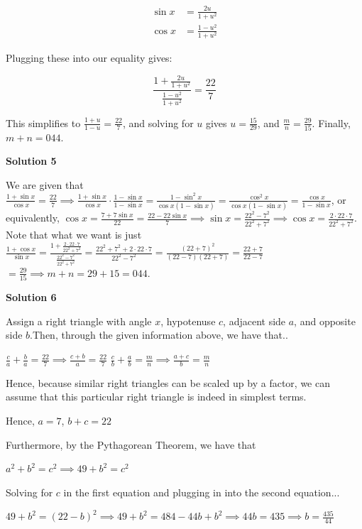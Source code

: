 \begin{enumerate}
 
 \begin{align*}\sin x &= \frac{2u}{1+u^2}\\ \cos x &= \frac{1-u^2}{1+u^2}\end{align*}


 Plugging these into our equality gives:

 
 \[\frac{1+\frac{2u}{1+u^2}}{\frac{1-u^2}{1+u^2}} = \frac{22}7\]

 This simplifies to $\frac{1+u}{1-u} = \frac{22}7$, and solving for $u$ gives $u = \frac{15}{29}$, and $\frac mn = \frac{29}{15}$. Finally, $m+n = 044$.

 



\textbf{Solution 5}

We are given that $\frac{1+\sin x}{\cos x}=\frac{22}7\implies\frac{1+\sin x}{\cos x}\cdot\frac{1-\sin x}{1-\sin x}=\frac{1-\sin^2x}{\cos x(1-\sin x)}=\frac{\cos^2x}{\cos x(1-\sin x)}$$=\frac{\cos x}{1-\sin x}$, or equivalently, $\cos x=\frac{7+7\sin x}{22}=\frac{22-22\sin x}7\implies\sin x=\frac{22^2-7^2}{22^2+7^2}$$\implies\cos x=\frac{2\cdot22\cdot7}{22^2+7^2}$. Note that what we want is just $\frac{1+\cos x}{\sin x}=\frac{1+\frac{2\cdot22\cdot7}{22^2+7^2}}{\frac{22^2-7^2}{22^2+7^2}}=\frac{22^2+7^2+2\cdot22\cdot7}{22^2-7^2}=\frac{(22+7)^2}{(22-7)(22+7)}=\frac{22+7}{22-7}$$=\frac{29}{15}\implies m+n=29+15=\boxed{044}$.

 



\textbf{Solution 6}

Assign a right triangle with angle $x$, hypotenuse $c$, adjacent side $a$, and opposite side $b$.Then, through the given information above, we have that..

 $\frac{c}{a}+\frac{b}{a}=\frac{22}{7}\implies \frac{c+b}{a}=\frac{22}{7}$
$\frac{c}{b}+\frac{a}{b}=\frac{m}{n}\implies \frac{a+c}{b}=\frac{m}{n}$

 Hence, because similar right triangles can be scaled up by a factor, we can assume that this particular right triangle is indeed in simplest terms.

 Hence, $a=7$, $b+c=22$

 Furthermore, by the Pythagorean Theorem, we have that

 $a^2+b^2=c^2\implies 49+b^2=c^2$

 Solving for $c$ in the first equation and plugging in into the second equation...

 $49+b^2=(22-b)^2\implies 49+b^2=484-44b+b^2\implies 44b=435\implies b=\frac{435}{44}$


\end{enumerate}
